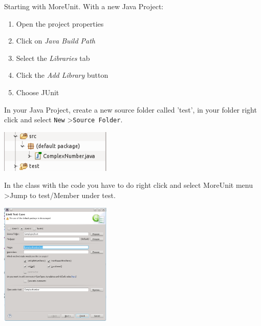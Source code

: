 \documentclass[11pt, xcolor=svgnames]{beamer}
\begin{document}

\begin{frame}
    Starting with MoreUnit. With a new Java Project:
    \begin{enumerate}
      \item Open the project properties
      \item Click on \emph{Java Build Path}
      \item Select the \emph{Libraries} tab
      \item Click the \emph{Add Library} button
      \item Choose JUnit
    \end{enumerate}
\end{frame}


\begin{frame}
     In your Java Project, create a new source folder called 'test', in your folder right click and select \texttt{New} \textgreater \texttt{Source Folder}.

    \begin{center}
      \includegraphics[width=150pt]{./figs/folder}
    \end{center}

\end{frame}




\begin{frame}

In the class with the code you have to do right click and select MoreUnit menu \textgreater Jump to test/Member under test.

\begin{center}
  \includegraphics[width=150pt]{./figs/Unitmenu}
\end{center}

\end{frame}
\end{document}

